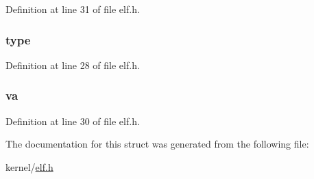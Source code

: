 Definition at line 31 of file elf.\-h.

\hypertarget{structproghdr_a4e4020c6e82bee6562d5bc3c1657cafe}{
\subsubsection[{type}]{ type}}\label{structproghdr_a4e4020c6e82bee6562d5bc3c1657cafe}


Definition at line 28 of file elf.\-h.

\hypertarget{structproghdr_a24266ece98365336cbbb0f5cbb092148}{
\subsubsection[{va}]{ va}}\label{structproghdr_a24266ece98365336cbbb0f5cbb092148}


Definition at line 30 of file elf.\-h.



The documentation for this struct was generated from the following file\-:\begin{DoxyCompactItemize}
\item 
kernel/\hyperlink{elf_8h}{elf.\-h}\end{DoxyCompactItemize}
